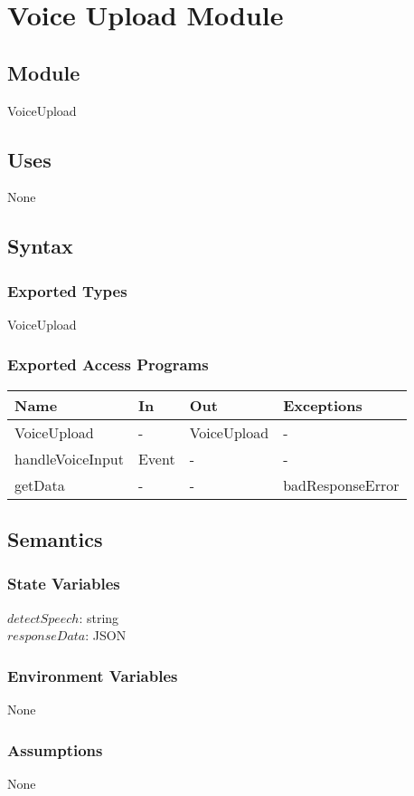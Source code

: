 \documentclass[12pt, titlepage]{article}
\begin{document}
\section{Voice Upload Module} \label{VoiceUpload} 
\subsection{Module}
VoiceUpload
\subsection{Uses}
None
\subsection{Syntax}
\subsubsection{Exported Types}
VoiceUpload
\subsubsection{Exported Access Programs}
\begin{center}
	\begin{tabular}{p{3cm} p{4cm} p{4cm} p{2cm}}
		\hline
		\textbf{Name} & \textbf{In} & \textbf{Out} & \textbf{Exceptions} \\
		\hline
		VoiceUpload & - & VoiceUpload & - \\
		handleVoiceInput & Event & - & - \\
		getData & - & - & badResponseError \\
		\hline
	\end{tabular}
\end{center}
\subsection{Semantics}
\subsubsection{State Variables}
$ detectSpeech $: string\\
$responseData$: JSON
\subsubsection{Environment Variables}
None
\subsubsection{Assumptions}
None
\end{document}
